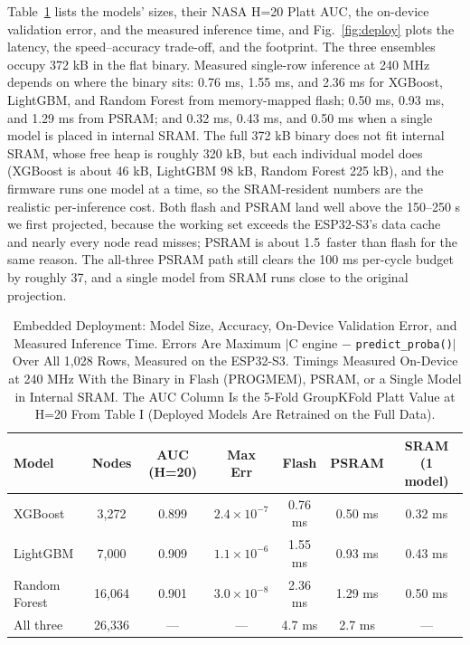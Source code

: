 \documentclass[journal]{IEEEtran}
\begin{document}
Table~\ref{tab:deploy} lists the models' sizes, their NASA H=20 Platt AUC, the on-device validation error, and the measured inference time, and Fig.~\ref{fig:deploy} plots the latency, the speed--accuracy trade-off, and the footprint. The three ensembles occupy 372 kB in the flat binary. Measured single-row inference at 240 MHz depends on where the binary sits: 0.76 ms, 1.55 ms, and 2.36 ms for XGBoost, LightGBM, and Random Forest from memory-mapped flash; 0.50 ms, 0.93 ms, and 1.29 ms from PSRAM; and 0.32 ms, 0.43 ms, and 0.50 ms when a single model is placed in internal SRAM. The full 372 kB binary does not fit internal SRAM, whose free heap is roughly 320 kB, but each individual model does (XGBoost is about 46 kB, LightGBM 98 kB, Random Forest 225 kB), and the firmware runs one model at a time, so the SRAM-resident numbers are the realistic per-inference cost. Both flash and PSRAM land well above the 150--250 \textmu s we first projected, because the working set exceeds the ESP32-S3's data cache and nearly every node read misses; PSRAM is about 1.5\texttimes\ faster than flash for the same reason. The all-three PSRAM path still clears the 100 ms per-cycle budget by roughly 37\texttimes, and a single model from SRAM runs close to the original projection.

\begin{table}[!t]
\caption{Embedded Deployment: Model Size, Accuracy, On-Device Validation Error, and Measured Inference Time. Errors Are Maximum $|$C engine $-$ \texttt{predict\_proba()}$|$ Over All 1,028 Rows, Measured on the ESP32-S3. Timings Measured On-Device at 240 MHz With the Binary in Flash (PROGMEM), PSRAM, or a Single Model in Internal SRAM. The AUC Column Is the 5-Fold GroupKFold Platt Value at H=20 From Table I (Deployed Models Are Retrained on the Full Data).}
\label{tab:deploy}
\centering
\begin{tabular}{lcccccc}
\toprule
\textbf{Model} & \textbf{Nodes} & \textbf{AUC (H=20)} & \textbf{Max Err} & \textbf{Flash} & \textbf{PSRAM} & \textbf{SRAM (1 model)}\\
\midrule
XGBoost & 3,272 & 0.899 & $2.4\times10^{-7}$ & 0.76 ms & 0.50 ms & 0.32 ms\\
LightGBM & 7,000 & 0.909 & $1.1\times10^{-6}$ & 1.55 ms & 0.93 ms & 0.43 ms\\
Random Forest & 16,064 & 0.901 & $3.0\times10^{-8}$ & 2.36 ms & 1.29 ms & 0.50 ms\\
All three & 26,336 & --- & --- & 4.7 ms & 2.7 ms & ---\\
\bottomrule
\end{tabular}
\end{table}
\end{document}
